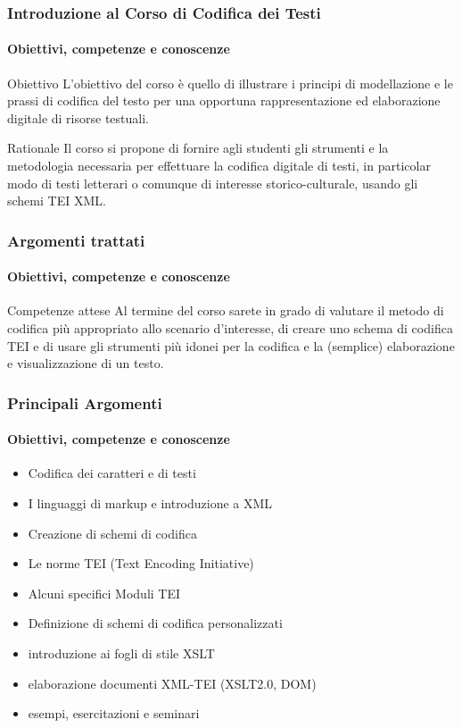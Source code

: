 \begin{frame}
    \frametitle{Introduzione al Corso di Codifica dei Testi}
    \framesubtitle{Obiettivi, competenze e conoscenze}
    \addtocounter{nframe}{1}
    
    \begin{block}{Obiettivo}
        L'obiettivo del corso è quello di illustrare i principi di modellazione e le prassi di codifica del testo per una opportuna rappresentazione ed elaborazione digitale di risorse testuali.  
    \end{block}

    \begin{block}{Rationale}
       Il corso si propone di fornire agli studenti gli strumenti e la metodologia necessaria per effettuare la codifica digitale di testi, in particolar modo di testi letterari o comunque di interesse storico-culturale, usando gli schemi TEI XML.
    \end{block}

\end{frame}

\begin{frame}
    \frametitle{Argomenti trattati}
    \framesubtitle{Obiettivi, competenze e conoscenze}
    \addtocounter{nframe}{1}
    
    \begin{block}{Competenze attese}
        Al termine del corso sarete in grado di valutare il metodo di codifica più appropriato allo scenario d'interesse, di creare uno schema di codifica TEI e di usare gli strumenti più idonei per la codifica e la (semplice) elaborazione e visualizzazione di un testo.
    \end{block}

    

\end{frame}

\begin{frame}
    \frametitle{Principali Argomenti}
    \framesubtitle{Obiettivi, competenze e conoscenze}
    \addtocounter{nframe}{1}

    
        \begin{itemize}
            \item Codifica dei caratteri e di testi
            \item I linguaggi di markup e introduzione a XML
            \item Creazione di schemi di codifica
            \item Le norme TEI (Text Encoding Initiative)
            \item Alcuni specifici Moduli TEI
            \item Definizione di schemi di codifica personalizzati
            \item introduzione ai fogli di stile XSLT
            \item elaborazione documenti XML-TEI (XSLT2.0, DOM)
            \item esempi, esercitazioni e seminari 
        \end{itemize}
    

\end{frame}


